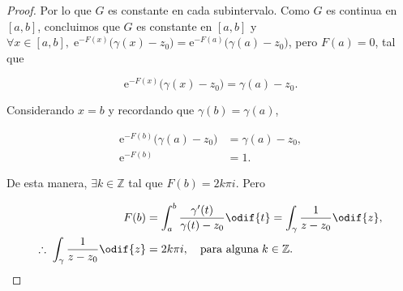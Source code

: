 \documentclass[../main.tex]{subfiles}
\begin{document}
\begin{proof}
    Por lo que \(G\) es constante en cada subintervalo. Como \(G\) es continua en \([a,
    b]\), concluimos que \(G\) es constante en \([a, b]\) y \(\forall x\in [a, b],\;
        \mathrm{e}^{-F(x)}\bigl(\gamma(x) - z_{0}\bigr) =
        \mathrm{e}^{-F(a)}\bigl(\gamma(a)
    - z_{0}\bigr)\), pero \(F(a) = 0\), tal que

    \begin{equation*}
        \mathrm{e}^{-F(x)}\bigl(\gamma(x) - z_{0}\bigr) = \gamma(a) - z_{0}.
    \end{equation*}

    Considerando \(x = b\) y recordando que \(\gamma(b) = \gamma(a)\),

    \begin{align*}
        \mathrm{e}^{-F(b)}\bigl(\gamma(a) - z_{0}\bigr) &= \gamma(a) - z_{0},\\
        \mathrm{e}^{-F(b)} &= 1.
    \end{align*}

    De esta manera, \(\exists k\in \mathbb{Z}\) tal que \(F(b) = 2k\pi i\). Pero

    \begin{align*}
        F(b) &= \int_{a}^{b}\dfrac{\gamma^{\prime}(t)}{\gamma(t) - z_{0}}\odif{t} =
        \int_{\gamma}^{}\dfrac{1}{z - z_{0}}\odif{z},\\
        \therefore\; \int_{\gamma}^{}\dfrac{1}{z - z_{0}}\odif{z} &= 2k\pi
        i,\quad \text{para
        alguna}\; k\in \mathbb{Z}.
    \end{align*}
\end{proof}
\end{document}
